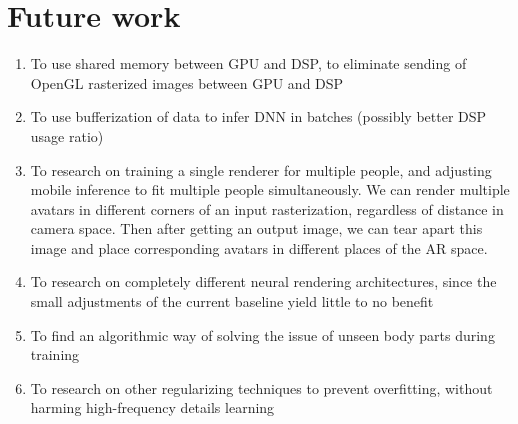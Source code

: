 \section{Future work}\label{res:future}
\begin{enumerate}
	\item To use shared memory between GPU and DSP, to eliminate sending of OpenGL rasterized images between GPU and DSP
	\item To use bufferization of data to infer DNN in batches (possibly better DSP usage ratio)
	\item To research on training a single renderer for multiple people, and adjusting mobile inference to fit multiple people simultaneously. We can render multiple avatars in different corners of an input rasterization, regardless of distance in camera space. Then after getting an output image, we can tear apart this image and place corresponding avatars in different places of the AR space.
	\item To research on completely different neural rendering architectures, since the small adjustments of the current baseline yield little to no benefit
	\item To find an algorithmic way of solving the issue of unseen body parts during training
	\item To research on other regularizing techniques to prevent overfitting, without harming high-frequency details learning 
\end{enumerate}